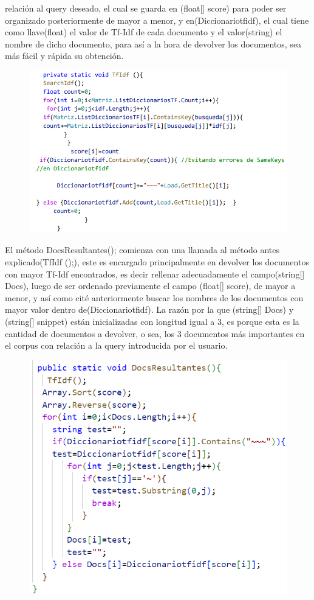 \documentclass[a4paper,12pt]{article}
\begin{document}
relación al query deseado, el cual se guarda en (float[] score) para poder ser organizado 
posteriormente de mayor a menor, y en(Diccionariotfidf), el cual tiene como llave(float) el 
valor de Tf-Idf de cada documento y el valor(string) el nombre de dicho documento, para así a 
la hora de devolver los documentos, sea más fácil y rápida su obtención.
\begin{figure}[h]
    \includegraphics*{code 4.png}
\end{figure}

El método DocsResultantes(); comienza con una llamada al método antes explicado(TfIdf ();), 
este es encargado principalmente en devolver los documentos con mayor Tf-Idf encontrados, 
es decir rellenar adecuadamente el campo(string[] Docs), luego de ser ordenado previamente 
el campo (float[] score), de mayor a menor, y así como cité anteriormente buscar los nombres 
de los documentos con mayor valor dentro de(Diccionariotfidf). La razón por la que (string[] 
Docs) y (string[] snippet) están inicializadas con longitud igual a 3, es porque esta es la cantidad 
de documentos a devolver, o sea, los 3 documentos más importantes en el corpus con relación 
a la query introducida por el usuario. 
\begin{figure}[h]
    \includegraphics*{code 5.png}
\end{figure}
 \newpage
\end{document}
